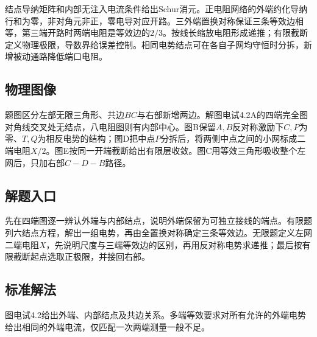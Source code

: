 \documentclass[UTF8,fontset=fandol,a4paper,11pt]{ctexart}
\begin{document}
结点导纳矩阵和内部无注入电流条件给出Schur消元。正电阻网络的外端约化导纳行和为零，非对角元非正，零电导对应开路。三外端置换对称保证三条等效边相等，第三端开路时两端电阻是等效边的$2/3$。按线长缩放电阻形成递推；有限截断定义物理极限，导数界给误差控制。相同电势结点可在各自子网均守恒时分拆，新增被动通路降低端口电阻。



\subsection*{物理图像}

题图区分左部无限三角形、共边$BC$与右部新增两边。解图电试4.2A的四端完全图对角线交叉处无结点，八电阻图则有内部中心。图B保留$A,B$反对称激励下$C,P$为零、$T,Q$为相反电势的结构；图D把中点$P$分拆后，将两侧中点之间的小网标成二端电阻$X/2$。图E按同一开端截断给出有限层收敛。图C用等效三角形吸收整个左网后，只加右部$C-D-B$路径。



\subsection*{解题入口}

先在四端图逐一辨认外端与内部结点，说明外端保留为可独立接线的端点。有限题列六结点方程，解出一组电势，再由全置换对称确定三条等效边。无限题定义左网二端电阻$X$，先说明尺度与三端等效边的区别，再用反对称电势求递推；最后按有限截断起点选取正极限，并接回右部。



\subsection*{标准解法}


图电试4.2给出外端、内部结点及共边关系。多端等效要求对所有允许的外端电势给出相同的外端电流，仅匹配一次两端测量一般不足。
\end{document}
